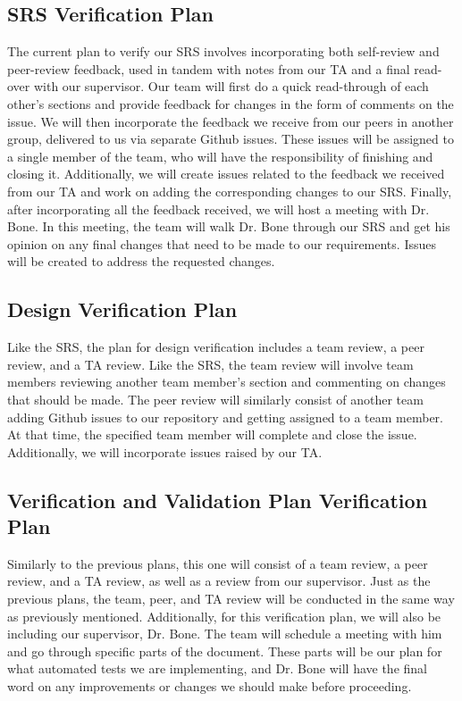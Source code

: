 \documentclass[12pt, titlepage]{article}
\begin{document}
\subsection{SRS Verification Plan}

The current plan to verify our SRS involves incorporating both self-review and peer-review feedback, used in tandem with notes from our TA 
and a final read-over with our supervisor. Our team will first do a quick read-through of each other's sections and provide feedback for changes
in the form of comments on the issue. We will then incorporate the feedback we receive from our peers in another group, delivered to us via 
separate Github issues. These issues will be assigned to a single member of the team, who will have the responsibility of finishing and closing it.
Additionally, we will create issues related to the feedback we received from our TA and work on adding the corresponding changes to our SRS. 
Finally, after incorporating all the feedback received, we will host a meeting with Dr. Bone. In this meeting, the team will walk Dr. Bone through
our SRS and get his opinion on any final changes that need to be made to our requirements. Issues will be created to address the requested changes.


\subsection{Design Verification Plan}

Like the SRS, the plan for design verification includes a team review, a peer review, and a TA review. Like the SRS, the 
team review will involve team members reviewing another team member's section and commenting on changes that should be made. 
The peer review will similarly consist of another team adding Github issues to our repository and getting assigned to a team member. 
At that time, the specified team member will complete and close the issue. Additionally, we will incorporate issues raised by our TA. 

\subsection{Verification and Validation Plan Verification Plan}

Similarly to the previous plans, this one will consist of a team review, a peer review, and a TA review, as well as a review from our
supervisor. Just as the previous plans, the team, peer, and TA review will be conducted in the same way as previously mentioned. Additionally,
for this verification plan, we will also be including our supervisor, Dr. Bone. The team will schedule a meeting with him and go through
specific parts of the document. These parts will be our plan for what automated tests we are implementing, and Dr. Bone will have the final word
on any improvements or changes we should make before proceeding.
\end{document}

